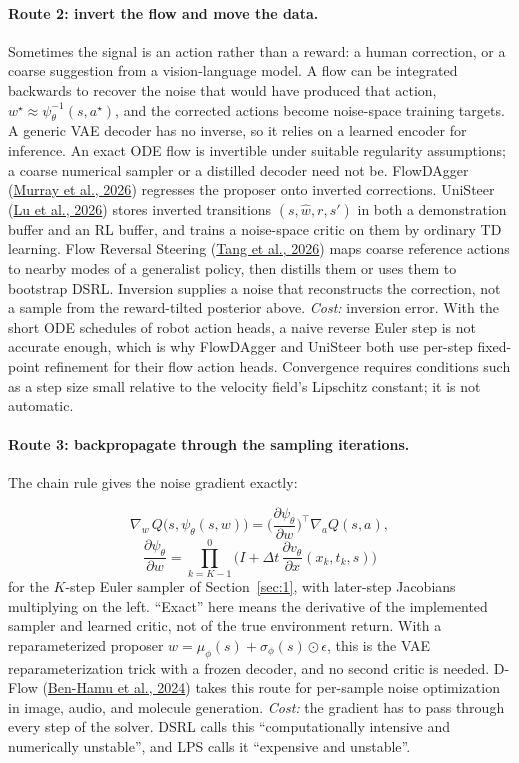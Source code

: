 \paragraph{Route 2: invert the flow and move the data.} Sometimes the signal is an action rather than a reward: a human correction, or a coarse suggestion from a vision-language model. A flow can be integrated backwards to recover the noise that would have produced that action, $w^\star \approx \psi_\theta^{-1}(s, a^\star)$, and the corrected actions become noise-space training targets. A generic VAE decoder has no inverse, so it relies on a learned encoder for inference. An exact ODE flow is invertible under suitable regularity assumptions; a coarse numerical sampler or a distilled decoder need not be. FlowDAgger (\hyperlink{ref:14}{Murray et al., 2026}) regresses the proposer onto inverted corrections. UniSteer (\hyperlink{ref:15}{Lu et al., 2026}) stores inverted transitions $(s, \hat w, r, s')$ in both a demonstration buffer and an RL buffer, and trains a noise-space critic on them by ordinary TD learning. Flow Reversal Steering (\hyperlink{ref:16}{Tang et al., 2026}) maps coarse reference actions to nearby modes of a generalist policy, then distills them or uses them to bootstrap DSRL. Inversion supplies a noise that reconstructs the correction, not a sample from the reward-tilted posterior above. \emph{Cost:} inversion error. With the short ODE schedules of robot action heads, a naive reverse Euler step is not accurate enough, which is why FlowDAgger and UniSteer both use per-step fixed-point refinement for their flow action heads. Convergence requires conditions such as a step size small relative to the velocity field's Lipschitz constant; it is not automatic.

\paragraph{Route 3: backpropagate through the sampling iterations.} The chain rule gives the noise gradient exactly:

\begin{equation}
\nabla_w\, Q\big(s, \psi_\theta(s, w)\big) = \Big(\frac{\partial \psi_\theta}{\partial w}\Big)^{\!\top} \nabla_a Q(s, a),
\end{equation}
\begin{equation}
\frac{\partial \psi_\theta}{\partial w} = \prod_{k=K-1}^{0} \Big(I + \Delta t\, \frac{\partial v_\theta}{\partial x}(x_k, t_k, s)\Big)
\end{equation}
for the $K$-step Euler sampler of Section~\ref{sec:1}, with later-step Jacobians multiplying on the left. ``Exact'' here means the derivative of the implemented sampler and learned critic, not of the true environment return. With a reparameterized proposer $w = \mu_\phi(s) + \sigma_\phi(s) \odot \epsilon$, this is the VAE reparameterization trick with a frozen decoder, and no second critic is needed. D-Flow (\hyperlink{ref:8}{Ben-Hamu et al., 2024}) takes this route for per-sample noise optimization in image, audio, and molecule generation. \emph{Cost:} the gradient has to pass through every step of the solver. DSRL calls this ``computationally intensive and numerically unstable'', and LPS calls it ``expensive and unstable''.

